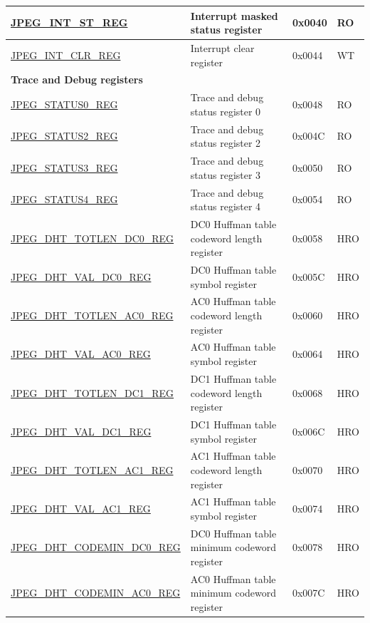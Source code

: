 \begin{longtable}{ | p{6cm} | p{6.8cm} | p{1.3cm} | p{1.4cm} | }
\hyperref[regdesc:JPEGINTSTREG]{JPEG\_INT\_ST\_REG} & Interrupt masked status register & 0x0040 & RO \\ \hline
\hyperref[regdesc:JPEGINTCLRREG]{JPEG\_INT\_CLR\_REG} & Interrupt clear register & 0x0044 & WT \\ \hline
\multicolumn{4}{|l|}{\textbf{Trace and Debug registers}} \\ \hline
\hyperref[regdesc:JPEGSTATUS0REG]{JPEG\_STATUS0\_REG} & Trace and debug status register 0 & 0x0048 & RO \\ \hline
\hyperref[regdesc:JPEGSTATUS2REG]{JPEG\_STATUS2\_REG} & Trace and debug status register 2 & 0x004C & RO \\ \hline
\hyperref[regdesc:JPEGSTATUS3REG]{JPEG\_STATUS3\_REG} & Trace and debug status register 3 & 0x0050 & RO \\ \hline
\hyperref[regdesc:JPEGSTATUS4REG]{JPEG\_STATUS4\_REG} & Trace and debug status register 4 & 0x0054 & RO \\ \hline
\hyperref[regdesc:JPEGDHTTOTLENDC0REG]{JPEG\_DHT\_TOTLEN\_DC0\_REG} & DC0 Huffman table codeword length register & 0x0058 & HRO \\ \hline
\hyperref[regdesc:JPEGDHTVALDC0REG]{JPEG\_DHT\_VAL\_DC0\_REG} & DC0 Huffman table symbol register & 0x005C & HRO \\ \hline
\hyperref[regdesc:JPEGDHTTOTLENAC0REG]{JPEG\_DHT\_TOTLEN\_AC0\_REG} & AC0 Huffman table codeword length register & 0x0060 & HRO \\ \hline
\hyperref[regdesc:JPEGDHTVALAC0REG]{JPEG\_DHT\_VAL\_AC0\_REG} & AC0 Huffman table symbol register & 0x0064 & HRO \\ \hline
\hyperref[regdesc:JPEGDHTTOTLENDC1REG]{JPEG\_DHT\_TOTLEN\_DC1\_REG} & DC1 Huffman table codeword length register & 0x0068 & HRO \\ \hline
\hyperref[regdesc:JPEGDHTVALDC1REG]{JPEG\_DHT\_VAL\_DC1\_REG} & DC1 Huffman table symbol register & 0x006C & HRO \\ \hline
\hyperref[regdesc:JPEGDHTTOTLENAC1REG]{JPEG\_DHT\_TOTLEN\_AC1\_REG} & AC1 Huffman table codeword length register & 0x0070 & HRO \\ \hline
\hyperref[regdesc:JPEGDHTVALAC1REG]{JPEG\_DHT\_VAL\_AC1\_REG} & AC1 Huffman table symbol register & 0x0074 & HRO \\ \hline
\hyperref[regdesc:JPEGDHTCODEMINDC0REG]{JPEG\_DHT\_CODEMIN\_DC0\_REG} & DC0 Huffman table minimum codeword register & 0x0078 & HRO \\ \hline
\hyperref[regdesc:JPEGDHTCODEMINAC0REG]{JPEG\_DHT\_CODEMIN\_AC0\_REG} & AC0 Huffman table minimum codeword register & 0x007C & HRO \\ \hline

\end{longtable}

